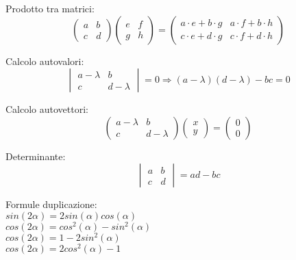 \documentclass[10pt,landscape, a4paper]{article}
\begin{document}
\begin{multicols}{3}
{Prodotto tra matrici:
\begin{equation*}
	\begin{pmatrix}
		a & b\\
		c & d
	\end{pmatrix} \begin{pmatrix}
		e & f\\
		g & h
	\end{pmatrix} = \begin{pmatrix}
		a\cdot e + b\cdot g & a\cdot f + b\cdot h\\
		c\cdot e + d\cdot g & c\cdot f + d\cdot h
	\end{pmatrix}
\end{equation*}

Calcolo autovalori:
\begin{equation*}
	\begin{vmatrix}
		a-\lambda & b\\
		c & d-\lambda
	\end{vmatrix} = 0 \Rightarrow (a-\lambda)(d-\lambda) - bc = 0
\end{equation*}

Calcolo autovettori:
\begin{equation*}
	\begin{pmatrix}
		a-\lambda & b\\
		c & d-\lambda
	\end{pmatrix} \begin{pmatrix}
		x\\
		y
	\end{pmatrix} = \begin{pmatrix}
		0\\
		0
	\end{pmatrix}
\end{equation*}

Determinante:
\begin{equation*}
	\begin{vmatrix}
		a & b\\
		c & d
	\end{vmatrix} = ad - bc
\end{equation*}


Formule duplicazione:\\
$sin(2\alpha) = 2sin(\alpha)cos(\alpha)$\\
$cos(2\alpha) = cos^2(\alpha) - sin^2(\alpha)$\\
$cos(2\alpha) = 1- 2sin^2(\alpha)$\\
$cos(2\alpha) = 2cos^2(\alpha) - 1$\\

}
\end{multicols}
\end{document}
